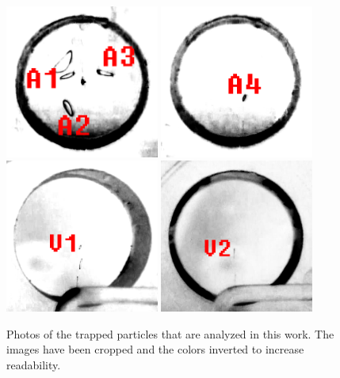 \documentclass[
	paper=A4,
	parskip=full,
	chapterprefix=true,
	11pt,
	headings=normal,
	bibliography=totoc,
	listof=totoc,
	titlepage=on,
]{scrreprt}
\begin{document}
\begin{figure}
	\centering
	\includegraphics[width=0.45\textwidth]{air_1}
	\includegraphics[width=0.45\textwidth]{air_2} \\
	\includegraphics[width=0.45\textwidth]{vacuum_1} 
	\includegraphics[width=0.45\textwidth]{vacuum_2} \\
	\caption{Photos of the trapped particles that are analyzed in this work. The images have been cropped and the colors inverted to increase readability.}
	\label{fig:particle_photos}
\end{figure}
\end{document}
